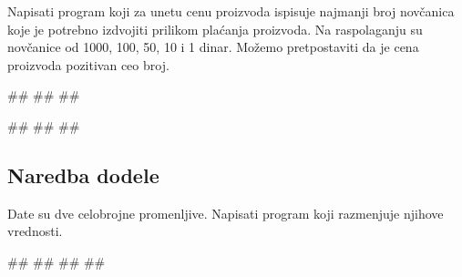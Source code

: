 \begin{Exercise}[label=v1.1_08] 
Napisati program koji za unetu cenu proizvoda ispisuje najmanji broj novčanica koje je potrebno izdvojiti prilikom plaćanja proizvoda. Na raspolaganju su novčanice od 1000, 100, 50, 10 i 1 dinar. Možemo pretpostaviti da je cena proizvoda pozitivan ceo broj.\\
\begin{miditest}
\begin{upotreba}{1}
#\naslovInt#
##
##
\end{upotreba}
\end{miditest}
\begin{miditest}
\begin{upotreba}{1}
#\naslovInt#
##
##
\end{upotreba}
\end{miditest}
\end{Exercise}
\begin{Answer}[ref=v1.1_08]
\end{Answer}



\subsection{Naredba dodele}
\begin{Exercise}[label=v1.1_10] 
Date su dve celobrojne promenljive. Napisati program koji razmenjuje njihove vrednosti.\\
\begin{miditest}
\begin{upotreba}{1}
#\naslovInt#
##
##
##
\end{upotreba}
\end{miditest}

\end{Exercise}
\begin{Answer}[ref=v1.1_10]
\end{Answer}

